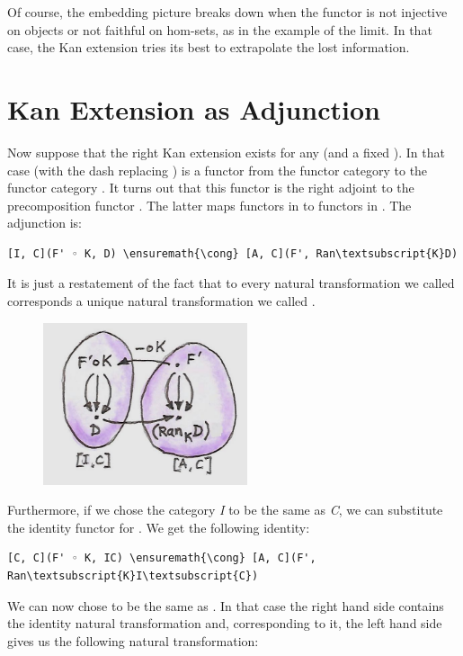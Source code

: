 \noindent
Of course, the embedding picture breaks down when the functor 
is not injective on objects or not faithful on hom-sets, as in the
example of the limit. In that case, the Kan extension tries its best to
extrapolate the lost information.

\section{Kan Extension as
Adjunction}\label{kan-extension-as-adjunction}

Now suppose that the right Kan extension exists for any  (and
a fixed ). In that case  (with the dash
replacing ) is a functor from the functor category
\code{{[}I, C{]}} to the functor category \code{{[}A, C{]}}. It
turns out that this functor is the right adjoint to the precomposition
functor . The latter maps functors in \code{{[}A, C{]}}
to functors in \code{{[}I, C{]}}. The adjunction is:

\begin{Verbatim}[commandchars=\\\{\}]
[I, C](F' ◦ K, D) \ensuremath{\cong} [A, C](F', Ran\textsubscript{K}D)
\end{Verbatim}
It is just a restatement of the fact that to every natural
transformation we called  corresponds a unique natural
transformation we called .

\begin{figure}[H]
\centering
\includegraphics[width=60mm]{images/kan92.jpg}
\end{figure}

\noindent
Furthermore, if we chose the category \emph{I} to be the same as
\emph{C}, we can substitute the identity functor  for
. We get the following identity:

\begin{Verbatim}[commandchars=\\\{\}]
[C, C](F' ◦ K, IC) \ensuremath{\cong} [A, C](F', Ran\textsubscript{K}I\textsubscript{C})
\end{Verbatim}
We can now chose  to be the same as . In
that case the right hand side contains the identity natural
transformation and, corresponding to it, the left hand side gives us the
following natural transformation:

